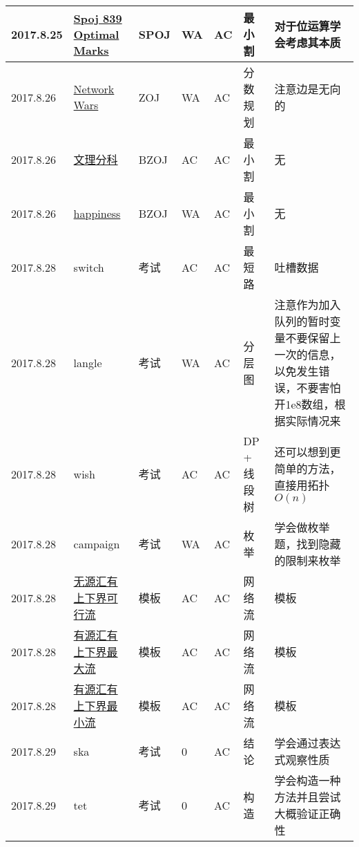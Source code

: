 \documentclass[a4paper]{article}
\begin{document}
\begin{longtable}{|p{1.5cm}|p{2.5cm}|p{1.6cm}|p{1.6cm}|p{1cm}|p{3cm}|p{4cm}|}
		\hline
		2017.8.25 & \href {http://www.lydsy.com/JudgeOnline/problem.php?id=2400}{Spoj 839 Optimal Marks}
		 & SPOJ & WA & AC & 最小割 & 对于位运算学会考虑其本质\\
		
		\hline
		2017.8.26 & \href {https://vjudge.net/problem/ZOJ-2676}{Network Wars}
		 & ZOJ & WA & AC & 分数规划 & 注意边是无向的\\
		
		\hline
		2017.8.26 & \href {http://www.lydsy.com/JudgeOnline/problem.php?id=3894}{文理分科}
		 & BZOJ & AC & AC & 最小割 & 无\\
		
		\hline
		2017.8.26 & \href {http://www.lydsy.com/JudgeOnline/problem.php?id=2127}{happiness}
		 & BZOJ & WA & AC & 最小割 & 无\\
		
		\hline
		2017.8.28 & switch
		 & 考试 & AC & AC & 最短路 & 吐槽数据\\
		
		\hline
		2017.8.28 & langle
		 & 考试 & WA & AC & 分层图 & 注意作为加入队列的暂时变量不要保留上一次的信息，以免发生错误，不要害怕开1e8数组，根据实际情况来\\
		
		\hline
		2017.8.28 & wish
		 & 考试 & AC & AC & DP + 线段树 & 还可以想到更简单的方法，直接用拓扑$O(n)$\\
		
		\hline
		2017.8.28 & campaign
		 & 考试 & WA & AC & 枚举 & 学会做枚举题，找到隐藏的限制来枚举\\
		
		\hline
		2017.8.28 & \href {https://www.loj.ac/problem/115}{无源汇有上下界可行流}
		 & 模板 & AC & AC & 网络流 & 模板\\
		
		\hline
		2017.8.28 & \href {https://www.loj.ac/problem/116}{有源汇有上下界最大流}
		 & 模板 & AC & AC & 网络流 & 模板\\
		
		\hline
		2017.8.28 & \href {https://www.loj.ac/problem/117}{有源汇有上下界最小流}
		 & 模板 & AC & AC & 网络流 & 模板\\
		
		\hline
		2017.8.29 & ska
		 & 考试 & 0 & AC & 结论 & 学会通过表达式观察性质\\
		
		\hline
		2017.8.29 & tet
		 & 考试 & 0 & AC & 构造 & 学会构造一种方法并且尝试大概验证正确性\\
		

\end{longtable}
\end{document}
